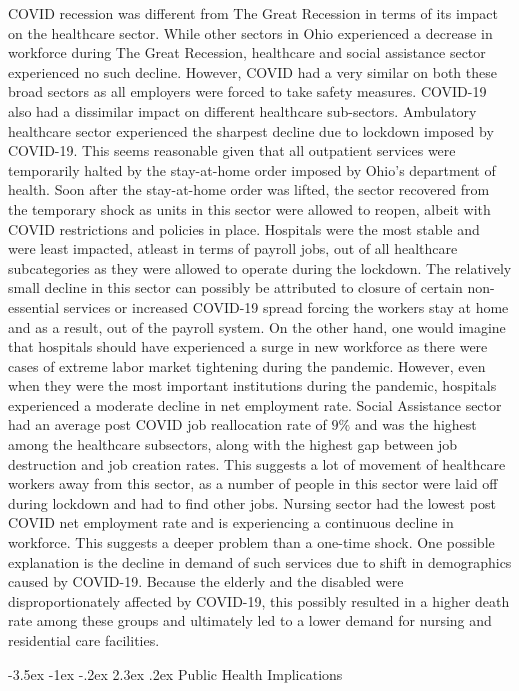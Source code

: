 \documentclass[11pt]{article}
\makeatletter
\renewcommand\section{\@startsection {section}{1}{\z@}%
                                       {-3.5ex \@plus -1ex \@minus -.2ex}%
                                       {2.3ex \@plus.2ex}%
                                       {\normalfont\fontfamily{phv}\fontsize{16}{19}\bfseries}}
\makeatother
\begin{document}
COVID recession was different from The Great Recession in terms of its impact on the healthcare sector. While other sectors in Ohio experienced a decrease in workforce during The Great Recession, healthcare and social assistance sector experienced no such decline. However, COVID had a very similar on both these broad sectors as all employers were forced to take safety measures.
COVID-19 also had a dissimilar impact on different healthcare sub-sectors.
Ambulatory healthcare sector experienced the sharpest decline due to lockdown imposed by COVID-19. This seems reasonable given that all outpatient services were temporarily halted by the stay-at-home order imposed by Ohio’s department of health. Soon after the stay-at-home order was lifted, the sector recovered from the temporary shock as units in this sector were allowed to reopen, albeit with COVID restrictions and policies in place.
Hospitals were the most stable and were least impacted, atleast in terms of payroll jobs, out of all healthcare subcategories as they were allowed to operate during the lockdown. The relatively small decline in this sector can possibly be attributed to closure of certain non-essential services or increased COVID-19 spread forcing the workers stay at home and as a result, out of the payroll system. On the other hand, one would imagine that hospitals should have experienced a surge in new workforce as there were cases of extreme labor market tightening during the pandemic. However, even when they were the most important institutions during the pandemic, hospitals experienced a moderate decline in net employment rate.
Social Assistance sector had an average post COVID job reallocation rate of $9\%$ and was the highest among the healthcare subsectors, along with the highest gap between job destruction and job creation rates. This suggests a lot of movement of healthcare workers away from this sector, as a number of people in this sector were laid off during lockdown and had to find other jobs. 
Nursing sector had the lowest post COVID net employment rate and is experiencing a continuous decline in workforce. This suggests a deeper problem than a one-time shock. One possible explanation is the decline in demand of such services due to shift in demographics caused by COVID-19. Because the elderly and the disabled were disproportionately affected by COVID-19, this possibly resulted in a higher death rate among these groups and ultimately led to a lower demand for nursing and residential care facilities. 


\section{Public Health Implications}\label{s:implications}
\end{document}
